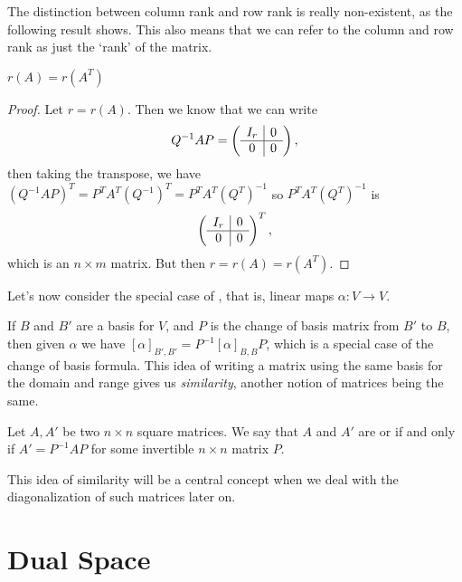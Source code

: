 \documentclass[a4paper]{scrartcl}
\begin{document}
The distinction between column rank and row rank is really non-existent, as the following result shows. This also means that we can refer to the column and row rank as just the `rank' of the matrix.

\begin{theorem}
    $r(A) = r(A^T)$
\end{theorem}
\begin{proof}
    Let $r = r(A)$. Then we know that 
    we can write
    $$
    Q^{-1}AP = \left(\begin{array}{ c | c }
        I_r & 0 \\
        \hline
        0 & 0
      \end{array}\right),
    $$
    then taking the transpose, we have $(Q^{-1}AP)^T = P^T A^T (Q^{-1})^T = P^T A^T (Q^T)^{-1}$
    so $P^T A^T (Q^T)^{-1}$ is 
    $$
    \left(\begin{array}{ c | c }
        I_r & 0 \\
        \hline
        0 & 0
      \end{array}\right)^T,
    $$
    which is an $n \times m$ matrix. But then $r = r(A) = r(A^T)$.
\end{proof}

Let's now consider the special case of , that is, linear maps $\alpha: V \rightarrow V$.

If $B$ and $B'$ are a basis for $V$, and $P$ is the change of basis matrix from $B'$ to $B$, then given $\alpha$ we have $[\alpha]_{B', B'} = P^{-1}[\alpha]_{B, B}P$, which is a special case of the change of basis formula.
This idea of writing a matrix using the same basis for the domain and range gives us \emph{similarity}, another notion of matrices being the same.

\begin{definition}
    Let $A, A'$ be two $n \times n$ square matrices. We say that $A$ and $A'$ are  or  if and only if  $A' = P^{-1} A P$ for some invertible $n \times n$ matrix $P$.
\end{definition}

This idea of similarity will be a central concept when we deal with the diagonalization of such matrices later on.


\section{Dual Space}
\end{document}
